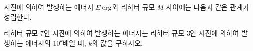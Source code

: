 지진에 의하여 발생하는 에너지 $E\mkern3mu \mathrm{erg}$와 리히터 규모 $M$ 사이에는 다음과 같은 관계가 성립한다. \par\smallskip{}\par\smallskip\noindent 리히터 규모 $7$인 지진에 의하여 발생하는 에너지는 리히터 규모 $3$인 지진에 의하여 발생하는 에너지의 $10^k$배일 때, $k$의 값을 구하시오.
